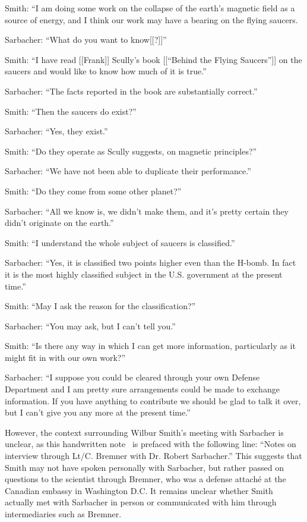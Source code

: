 \begin{svgraybox}
\noindent  Smith: ``I am doing some work on the collapse of the earth's magnetic field as a source of energy, and I think our work may have a bearing on the flying saucers.

\noindent  Sarbacher: ``What do you want to know[[?]]''

\noindent  Smith: ``I have read [[Frank]] Scully's book [[``Behind the Flying Saucers'']]
on the saucers and would like to know how much of it is true.''

\noindent  Sarbacher: ``The facts reported in the book are substantially correct.''

\noindent  Smith: ``Then the saucers do exist?''

\noindent  Sarbacher: ``Yes, they exist.''

\noindent  Smith: ``Do they operate as Scully suggests, on magnetic principles?''

\noindent  Sarbacher: ``We have not been able to duplicate their performance.''

\noindent  Smith: ``Do they come from some other planet?''

\noindent  Sarbacher: ``All we know is, we didn't make them, and it's pretty certain they didn't originate on the earth.''

\noindent  Smith: ``I understand the whole subject of saucers is classified.''

\noindent  Sarbacher: ``Yes, it is classified two points higher even than the H-bomb.
In fact it is the most highly classified subject in the U.S. government at the present time.''

\noindent  Smith: ``May I ask the reason for the classification?''

\noindent  Sarbacher: ``You may ask, but I can't tell you.''

\noindent  Smith: ``Is there any way in which I can get more information, particularly as it might fit in with our own work?''

\noindent  Sarbacher: ``I suppose you could be cleared through your own Defense Department and
I am pretty sure arrangements could be made to exchange information. If you have anything to contribute we should be glad to talk it over,
but I can't give you any more at the present time.''
\end{svgraybox}

However, the context surrounding Wilbur Smith's meeting with Sarbacher is unclear, as this handwritten note~\cite{SmithWilbertNotes} is prefaced with the following line:
``Notes on interview through Lt/C. Bremner with Dr. Robert Sarbacher.''
This suggests that Smith may not have spoken personally with Sarbacher,
but rather passed on questions to the scientist through Bremner, who was a defense attach\'e at the Canadian embassy in Washington D.C.
It remains unclear whether Smith actually met
with Sarbacher in person or communicated with him through intermediaries such as Bremner.

